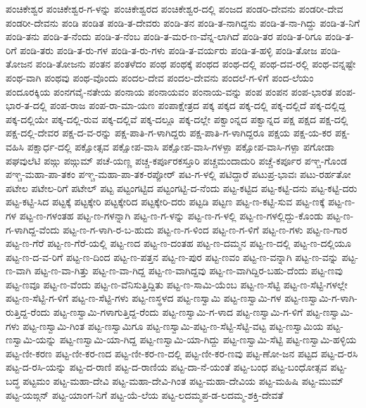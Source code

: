 ಪಂಚಿಕೇಶ್ವರ
ಪಂಚಿಕೇಶ್ವರ-ಗ-ಳನ್ನು
ಪಂಚಿಕೇಶ್ವರದ
ಪಂಚಿಕೇಶ್ವರ-ದಲ್ಲಿ
ಪಂಜದ
ಪಂಡರಿ-ದೇವನು
ಪಂಡರೀ-ದೇವ
ಪಂಡರೀ-ದೇವನು
ಪಂಡಿ
ಪಂಡಿತ
ಪಂಡಿ-ತ-ದೇವರು
ಪಂಡಿ-ತನ
ಪಂಡಿ-ತ-ನಾಗಿದ್ದನು
ಪಂಡಿ-ತ-ನಾ-ಗಿದ್ದು
ಪಂಡಿ-ತ-ನಿಗೆ
ಪಂಡಿ-ತನು
ಪಂಡಿ-ತ-ನೆಂದು
ಪಂಡಿ-ತ-ನೆಂಬ
ಪಂಡಿ-ತ-ಮರ-ಣ-ವೆನ್ನ-ಲಾಗಿದೆ
ಪಂಡಿ-ತರ
ಪಂಡಿ-ತ-ರಿಗೂ
ಪಂಡಿ-ತ-ರಿಗೆ
ಪಂಡಿ-ತರು
ಪಂಡಿ-ತ-ರು-ಗಳ
ಪಂಡಿ-ತ-ರು-ಗಳು
ಪಂಡಿ-ತ-ವರ್ಯರು
ಪಂಡಿ-ತ-ಹಳ್ಳಿ
ಪಂಡಿ-ತೋಜ
ಪಂಡಿ-ತೋಜನ
ಪಂಡಿ-ತೋಜನು
ಪಂತನ
ಪಂತಳೆದಂ
ಪಂಥ
ಪಂಥಕ್ಕೆ
ಪಂಥದ
ಪಂಥ-ದಲ್ಲಿ
ಪಂಥ-ದವ-ರಲ್ಲಿ
ಪಂಥ-ವನ್ನಷ್ಟೇ
ಪಂಥ-ವಾಗಿ
ಪಂಥವು
ಪಂಥ-ವೊಂದು
ಪಂದಲ-ದೇವ
ಪಂದಲ-ದೇವನು
ಪಂದಲೆ-ಗ-ಳಿಗೆ
ಪಂದ-ಲೆಯಂ
ಪಂದೂರಕ್ಕಿಯ
ಪಂನಗವೈ-ನತೇಯ
ಪಂನಾಯ
ಪಂನಾಯವಂ
ಪಂನಾಯ-ವನ್ನು
ಪಂಪ
ಪಂಪನ
ಪಂಪ-ಭಾರತ
ಪಂಪ-ಭಾರ-ತ-ದಲ್ಲಿ
ಪಂಪ-ರಾಜ
ಪಂಪ-ರಾ-ಮಾ-ಯಣ
ಪಂಪಾಕ್ಷೇತ್ರದ
ಪಕ್ಕ
ಪಕ್ಕದ
ಪಕ್ಕ-ದಲ್ಲಿ
ಪಕ್ಕ-ದಲ್ಲಿದೆ
ಪಕ್ಕ-ದಲ್ಲಿದ್ದ
ಪಕ್ಕ-ದಲ್ಲಿಯೇ
ಪಕ್ಕ-ದಲ್ಲಿ-ರುವ
ಪಕ್ಕ-ದಲ್ಲಿವೆ
ಪಕ್ಕ-ದಲ್ಲೂ
ಪಕ್ಕ-ದಲ್ಲೇ
ಪಕ್ವಾಂನ್ನದ
ಪಕ್ವಾನ್ನದ
ಪಕ್ಷ
ಪಕ್ಷದ
ಪಕ್ಷ-ದಲ್ಲಿ
ಪಕ್ಷ-ದಲ್ಲಿ-ದೇವರ
ಪಕ್ಷ-ದ-ವ-ರನ್ನು
ಪಕ್ಷ-ಪಾತಿ-ಗ-ಳಾಗಿದ್ದರು
ಪಕ್ಷ-ಪಾತಿ-ಗ-ಳಾಗಿದ್ದರೂ
ಪಕ್ಷಯ
ಪಕ್ಷ-ಯ-ಕರ
ಪಕ್ಷ-ವಹಿಸಿ
ಪಕ್ಷಾರ್ಧ-ದಲ್ಲಿ
ಪಕ್ಷೋತ್ಸವ
ಪಕ್ಷೋಪ-ವಾಸಿ
ಪಕ್ಷೋಪ-ವಾಸಿ-ಗಳಳ್ಪಾ
ಪಕ್ಷೋಪ-ವಾಸಿ-ಗಳ್ಪಾ
ಪಗೋಡಾ
ಪಘವುಲೆಟಿ
ಪಙ್ಗು
ಪಙ್ಗುಮ್
ಪಚೆ-ಯಣ್ಣ
ಪಚ್ಚ-ಕರ್ಪೂರಕಸ್ತೂರಿ
ಪಚ್ಚಮಂದಾದುರಿ
ಪಚ್ಚೆ-ಕರ್ಪೂರ
ಪಞ್ಚ-ಗೊಂಡ
ಪಞ್ಚ-ಮಹಾ-ಪಾ-ತಕಂ
ಪಞ್ಚ-ಮಹಾ-ಪಾ-ತಕ-ರಪ್ಪೋರ್
ಪಟ-ಗ-ಳಲ್ಲಿ
ಪಟಿದ್ದಾರೆ
ಪಟುಪ್ರ-ಭಾವಃ
ಪಟು-ರರ್ಹತೋ
ಪಟೇಲ
ಪಟೇಲ-ರಿಗೆ
ಪಟೇಲ್
ಪಟ್ಟ
ಪಟ್ಟಂಗಟ್ಟಿದ
ಪಟ್ಟಂಗಟ್ಟಿ-ದ-ನೆಂದು
ಪಟ್ಟ-ಕಟ್ಟಿದ
ಪಟ್ಟ-ಕಟ್ಟಿ-ದನು
ಪಟ್ಟ-ಕಟ್ಟಿ-ದರು
ಪಟ್ಟ-ಕಟ್ಟಿ-ಸಿದ
ಪಟ್ಟಕ್ಕೆ
ಪಟ್ಟಕ್ಕೇರಿ
ಪಟ್ಟಕ್ಕೇರಿದ
ಪಟ್ಟಕ್ಕೇರಿ-ದರು
ಪಟ್ಟಡಿ
ಪಟ್ಟಣ
ಪಟ್ಟ-ಣ-ಕಟ್ಟಿ-ಸುವ
ಪಟ್ಟ-ಣಕ್ಕೆ
ಪಟ್ಟ-ಣ-ಗಳ
ಪಟ್ಟ-ಣ-ಗಳಂತಹ
ಪಟ್ಟ-ಣ-ಗಳನ್ನಾಗಿ
ಪಟ್ಟ-ಣ-ಗ-ಳನ್ನು
ಪಟ್ಟ-ಣ-ಗ-ಳಲ್ಲಿ
ಪಟ್ಟ-ಣ-ಗಳಲ್ಲಿದ್ದು-ಕೊಂಡು
ಪಟ್ಟ-ಣ-ಗ-ಳಾಗಿದ್ದ-ವೆಂದು
ಪಟ್ಟ-ಣ-ಗ-ಳಾಗಿ-ರ-ಬ-ಹುದು
ಪಟ್ಟ-ಣ-ಗ-ಳಿಂದ
ಪಟ್ಟ-ಣ-ಗ-ಳಿಗೆ
ಪಟ್ಟ-ಣ-ಗಳು
ಪಟ್ಟ-ಣ-ಗಾರ
ಪಟ್ಟ-ಣ-ಗೆರೆ
ಪಟ್ಟ-ಣ-ಗೆರೆ-ಯಲ್ಲಿ
ಪಟ್ಟ-ಣದ
ಪಟ್ಟ-ಣ-ದಂತಹ
ಪಟ್ಟ-ಣ-ದಮ್ಮನ
ಪಟ್ಟ-ಣ-ದಲ್ಲಿ
ಪಟ್ಟ-ಣ-ದಲ್ಲಿಯೂ
ಪಟ್ಟ-ಣ-ದ-ವ-ರಿಗೆ
ಪಟ್ಟ-ಣ-ದಿಂದ
ಪಟ್ಟ-ಣ-ಪತ್ತನ
ಪಟ್ಟ-ಣ-ಪುರ
ಪಟ್ಟ-ಣವಂ
ಪಟ್ಟ-ಣ-ವನ್ನಾಗಿ
ಪಟ್ಟ-ಣ-ವನ್ನು
ಪಟ್ಟ-ಣ-ವಾಗಿ
ಪಟ್ಟ-ಣ-ವಾ-ಗಿತ್ತು
ಪಟ್ಟ-ಣ-ವಾ-ಗಿದ್ದ
ಪಟ್ಟ-ಣ-ವಾಗಿದ್ದವು
ಪಟ್ಟ-ಣ-ವಾಗಿದ್ದಿರ-ಬಹು-ದೆಂದು
ಪಟ್ಟ-ಣವು
ಪಟ್ಟ-ಣವೂ
ಪಟ್ಟ-ಣ-ವೆಂದು
ಪಟ್ಟ-ಣ-ವೆನಿಸುತ್ತಿದ್ದಿತು
ಪಟ್ಟ-ಣ-ಸಾಮಿ-ಯೆಂಬ
ಪಟ್ಟ-ಣ-ಸೆಟ್ಟಿ
ಪಟ್ಟ-ಣ-ಸೆಟ್ಟಿ-ಗಳಲ್ಲೇ
ಪಟ್ಟ-ಣ-ಸೆಟ್ಟಿ-ಗ-ಳಿಗೆ
ಪಟ್ಟ-ಣ-ಸೆಟ್ಟಿ-ಗಳು
ಪಟ್ಟ-ಣಸ್ಥಳದ
ಪಟ್ಟ-ಣಸ್ವಾಮಿ
ಪಟ್ಟ-ಣಸ್ವಾಮಿ-ಗಳ
ಪಟ್ಟ-ಣಸ್ವಾಮಿ-ಗ-ಳಾಗಿ-ರುತ್ತಿದ್ದ-ರೆಂದು
ಪಟ್ಟ-ಣಸ್ವಾಮಿ-ಗಳಾಗುತ್ತಿದ್ದ-ರೆಂದು
ಪಟ್ಟ-ಣಸ್ವಾಮಿ-ಗ-ಳಾದ
ಪಟ್ಟ-ಣಸ್ವಾಮಿ-ಗ-ಳಿಗೆ
ಪಟ್ಟ-ಣಸ್ವಾಮಿ-ಗಳು
ಪಟ್ಟ-ಣಸ್ವಾಮಿ-ಗಿಂತ
ಪಟ್ಟ-ಣಸ್ವಾಮಿಗೂ
ಪಟ್ಟ-ಣಸ್ವಾಮಿ-ಪಟ್ಟ-ಣ-ಸೆಟ್ಟಿ-ಸೆಟ್ಟಿ-ವಟ್ಟ
ಪಟ್ಟ-ಣಸ್ವಾಮಿಯ
ಪಟ್ಟ-ಣಸ್ವಾಮಿ-ಯನ್ನು
ಪಟ್ಟ-ಣಸ್ವಾಮಿ-ಯಾ-ಗಿದ್ದ
ಪಟ್ಟ-ಣಸ್ವಾಮಿ-ಯಾ-ಗಿದ್ದು
ಪಟ್ಟ-ಣಸ್ವಾಮಿ-ಸೆಟ್ಟಿ
ಪಟ್ಟ-ಣಸ್ವಾಮಿ-ಹಳ್ಳಿಯ
ಪಟ್ಟ-ಣೀ-ಕರಣ
ಪಟ್ಟ-ಣೀ-ಕರ-ಣದ
ಪಟ್ಟ-ಣೀ-ಕರ-ಣ-ದಲ್ಲಿ
ಪಟ್ಟ-ಣೀ-ಕರ-ಣವು
ಪಟ್ಟ-ಣೋ-ಜನ
ಪಟ್ಟದ
ಪಟ್ಟ-ದ-ರಸಿ
ಪಟ್ಟ-ದ-ರಸಿ-ಯನ್ನು
ಪಟ್ಟ-ದ-ರಾಣಿ
ಪಟ್ಟ-ದ-ರಾಣಿಯ
ಪಟ್ಟ-ದಾ-ನೆ-ಯಂತೆ
ಪಟ್ಟ-ಬಂಧ
ಪಟ್ಟ-ಬಂಧೋತ್ಸವ
ಪಟ್ಟ-ಬದ್ಧ
ಪಟ್ಟಮಂ
ಪಟ್ಟ-ಮಹಾ-ದೇವಿ
ಪಟ್ಟ-ಮಹಾ-ದೇವಿ-ಗಿಂತ
ಪಟ್ಟ-ಮಹಾ-ದೇವಿಯ
ಪಟ್ಟ-ಮಹಿಷಿ
ಪಟ್ಟ-ಮುಮ್
ಪಟ್ಟ-ಯಙ್ಗನ್
ಪಟ್ಟ-ಯಾಂಗ-ನಿಗೆ
ಪಟ್ಟ-ಯೆ-ಲೆಯ
ಪಟ್ಟ-ಲದಮ್ಮಪ-ಡ-ಲದಮ್ಮ-ಶಕ್ತಿ-ದೇವತೆ
